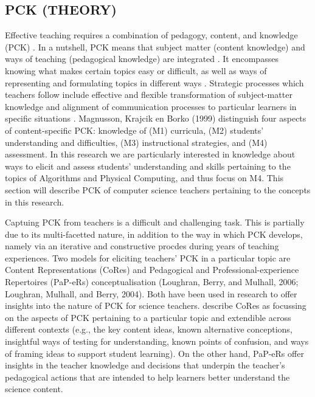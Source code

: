 \subsection{PCK (THEORY)}
Effective teaching requires a combination of pedagogy, content, and knowledge (PCK) \cite{shulman1986pedagogical}. In a nutshell, PCK means that subject matter (content knowledge) and ways of teaching (pedagogical knowledge) are integrated \cite{Yadav2016}. It encompasses knowing what makes certain topics easy or difficult, as well as ways of representing and formulating topics in different ways \cite{shulman1986pedagogical}. Strategic processes which teachers follow include effective and flexible transformation of subject-matter knowledge and alignment of communication processes to particular learners in specific situations \cite{shulman1986pedagogical}. Magnusson, Krajcik en Borko (1999) distinguish four aspects of content-specific PCK: knowledge of (M1) curricula, (M2) students' understanding and difficulties, (M3) instructional strategies, and (M4) assessment.  In this research we are particularly interested in knowledge about ways to elicit and assess students' understanding and skills pertaining to the topics of Algorithms and Physical Computing, and thus focus on M4. This section will describe PCK of computer science teachers pertaining to the concepts in this research.

Captuing PCK from teachers is a difficult and challenging task. This is partially due to its multi-facetted nature, in addition to the way in which PCK develops, namely via an iterative and constructive procdes during years of teaching experiences. Two models for eliciting teachers' PCK in a particular topic are Content Representations (CoRes) and Pedagogical and Professional-experience Repertoires (PaP-eRs) conceptualisation (Loughran, Berry, and Mulhall, 2006; Loughran, Mulhall, and Berry, 2004). Both have been used in research to offer insights into the nature of PCK for science teachers\cite{loughran2008PCKscience}. \citeauthor{loughran2008PCKscience} describe CoRes as focussing on the aspects of PCK pertaining to a particular topic and extendible across different contexts (e.g., the key content ideas, known alternative conceptions, insightful ways of testing for understanding, known points of confusion, and ways of framing ideas to support student learning). On the other hand, PaP-eRs offer insights in the teacher knowledge and decisions that underpin the teacher's pedagogical actions that are intended to help learners better understand the science content.

